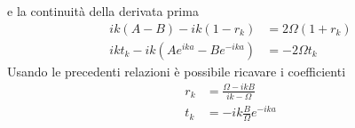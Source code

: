 \documentclass[a4paper]{article}
\begin{document}
        e la continuità della derivata prima
        \begin{equation*}
            \begin{split}
                ik(A-B)-ik(1-r_k)&=2\Omega(1+r_k)\\
                ikt_k-ik(Ae^{ika}-Be^{-ika})&=-2\Omega t_k
            \end{split}
        \end{equation*}
        Usando le precedenti relazioni è possibile ricavare i coefficienti
        \begin{equation*}
            \begin{split}
                r_k&=\frac{\Omega-ikB}{ik-\Omega}\\
                t_k&=-ik\frac{B}{\Omega}e^{-ika}
            \end{split}
        \end{equation*}
        \begin{center}
        \end{center}
\end{document}
